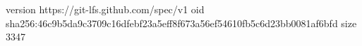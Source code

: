 version https://git-lfs.github.com/spec/v1
oid sha256:46c9b5da9c3709c16dfebf23a5eff8f673a56ef54610fb5c6d23bb0081af6bfd
size 3347
